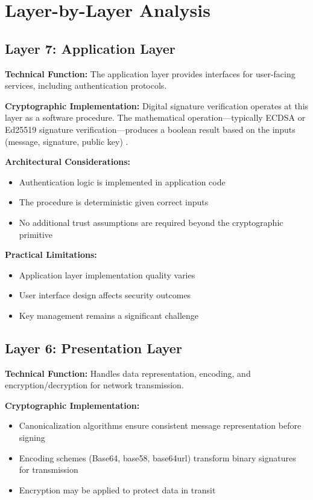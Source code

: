 \documentclass[11pt,a4paper]{article}
\begin{document}
\section{Layer-by-Layer Analysis}

\subsection{Layer 7: Application Layer}

\textbf{Technical Function:} The application layer provides interfaces for user-facing services, including authentication protocols.

\textbf{Cryptographic Implementation:} Digital signature verification operates at this layer as a software procedure. The mathematical operation---typically ECDSA or Ed25519 signature verification---produces a boolean result based on the inputs (message, signature, public key) \citep{nist2023}.

\textbf{Architectural Considerations:}
\begin{itemize}[leftmargin=*]
    \item Authentication logic is implemented in application code
    \item The procedure is deterministic given correct inputs
    \item No additional trust assumptions are required beyond the cryptographic primitive
\end{itemize}

\textbf{Practical Limitations:}
\begin{itemize}[leftmargin=*]
    \item Application layer implementation quality varies
    \item User interface design affects security outcomes
    \item Key management remains a significant challenge
\end{itemize}

\subsection{Layer 6: Presentation Layer}

\textbf{Technical Function:} Handles data representation, encoding, and encryption/decryption for network transmission.

\textbf{Cryptographic Implementation:}
\begin{itemize}[leftmargin=*]
    \item Canonicalization algorithms ensure consistent message representation before signing
    \item Encoding schemes (Base64, base58, base64url) transform binary signatures for transmission
    \item Encryption may be applied to protect data in transit
\end{itemize}
\end{document}
